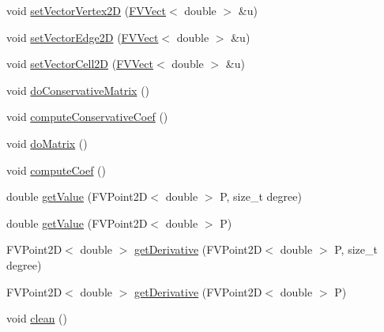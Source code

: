 \begin{DoxyCompactItemize}
\item 
void \hyperlink{classFVRecons2D_ab7a2586dc96682fbdfd945755620f3cc}{setVectorVertex2D} (\hyperlink{classFVVect}{FVVect}$<$ double $>$ \&u)
\item 
void \hyperlink{classFVRecons2D_a2f6606e5da89f8268f32d1f63dff07d9}{setVectorEdge2D} (\hyperlink{classFVVect}{FVVect}$<$ double $>$ \&u)
\item 
void \hyperlink{classFVRecons2D_aedbe092efe0b4fb30f1c6009988e649d}{setVectorCell2D} (\hyperlink{classFVVect}{FVVect}$<$ double $>$ \&u)
\item 
void \hyperlink{classFVRecons2D_ace350e893da1fc1e34121063885b4d66}{doConservativeMatrix} ()
\item 
void \hyperlink{classFVRecons2D_a8d6d0de3223ec5b38427aac5a0b4b2a0}{computeConservativeCoef} ()
\item 
void \hyperlink{classFVRecons2D_a778ff476790db0a772b0de4670138fd1}{doMatrix} ()
\item 
void \hyperlink{classFVRecons2D_a542380877cfbecb217d6079b325bcc9b}{computeCoef} ()
\item 
double \hyperlink{classFVRecons2D_ac1cc4ea8df74c7a534d6cfbcdcfbb2f9}{getValue} (FVPoint2D$<$ double $>$ P, size\_\-t degree)
\item 
double \hyperlink{classFVRecons2D_a8813590c93228ac4cab9e6c3c1d2dd99}{getValue} (FVPoint2D$<$ double $>$ P)
\item 
FVPoint2D$<$ double $>$ \hyperlink{classFVRecons2D_a5f177a63e2041865e9c629f0eb4a06a5}{getDerivative} (FVPoint2D$<$ double $>$ P, size\_\-t degree)
\item 
FVPoint2D$<$ double $>$ \hyperlink{classFVRecons2D_a950d06dbe4a1c248ba83ac1689156272}{getDerivative} (FVPoint2D$<$ double $>$ P)
\item 
void \hyperlink{classFVRecons2D_a2bbe646c052baf99f04a367ef6031d74}{clean} ()
\end{DoxyCompactItemize}


